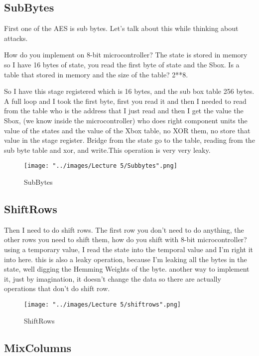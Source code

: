 \documentclass{report}
\begin{document}
\subsection{SubBytes}
First one of the AES is sub bytes. Let's talk about this while thinking about attacks. 

How do you implement on 8-bit microcontroller? The state is stored in memory so I have 16 bytes of state, you read the first byte of state and the Sbox. Is a table that stored in memory and the size of the table? 2**8. 

So I have this stage registered which is 16 bytes, and the sub box table 256 bytes. A full loop and I took the first byte, first you read it and then I needed to read from the table who is the address that I just read and then I get the value the Sbox, (we know inside the microcontroller) who does right component units the value of the states and the value of the Xbox table, no XOR them, no store that value in the stage register. Bridge from the state go to the table, reading from the sub byte table and xor, and write.This operation is very very leaky.

\begin{figure}[htp]
\centering
\texttt{[image: "../images/Lecture 5/Subbytes".png]}
\caption{SubBytes}
\label{}
\end{figure}

\subsection{ShiftRows}

Then I need to do shift rows. The first row you don't need to do anything, the other rows you need to shift them, how do you shift with 8-bit microcontroller? using a temporary value, I read the state into the temporal value and I'm right it into here. this is also a leaky operation, because I'm leaking all the bytes in the state, well digging the Hemming Weights of the byte. another way to implement it, just by imagination, it doesn't change the data so there are actually operations that don't do shift row.

\begin{figure}[htp]
\centering
\texttt{[image: "../images/Lecture 5/shiftrows".png]}
\caption{ShiftRows}
\label{}
\end{figure}

\subsection{MixColumns}
\end{document}
